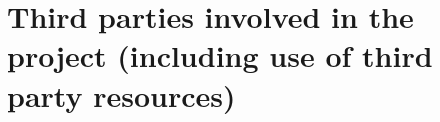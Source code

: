 \newpage
\newpage
\newpage
\newpage
\newpage
\newpage
\newpage
\newpage
\newpage
\newpage
\newpage
\newpage
\newpage
\newpage
\newpage
\newpage
\newpage
\newpage
\newpage
\newpage
\newpage
\newpage
\newpage
\newpage
\newpage
\newpage
\newpage
\newpage
\newpage
\newpage

\section{Third parties involved in the project (including use of third party resources)}


